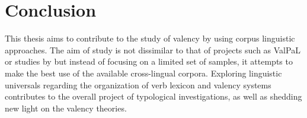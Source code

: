 \section{Conclusion}\label{sec:conclusion}

This thesis aims to contribute to the study of valency by using corpus linguistic approaches. The aim of study is not dissimilar to that of projects such as ValPaL or studies by \citet{say2014} but instead of focusing on a limited set of samples, it attempts to make the best use of the available cross-lingual corpora. Exploring linguistic universals regarding the organization of verb lexicon and valency systems contributes to the overall project of typological investigations, as well as shedding new light on the valency theories.